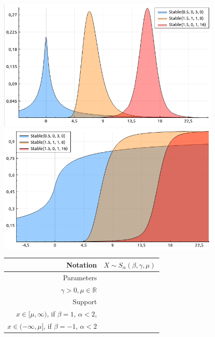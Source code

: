 \documentclass[a4paper,11pt]{article}
\theoremstyle{plain}
\theoremstyle{definition}
\newcommand{\MR}{\mathbb{R}}
\begin{document}
	\begin{figure}[!htb]\centering
		\begin{minipage}{0.55\textwidth}
			\includegraphics[width=\linewidth, right]{stable_pdf}
			\captionsetup{labelformat=empty}
			\includegraphics[width=\linewidth, right]{stable_cdf}
			\captionsetup{labelformat=empty}
		\end{minipage}
		\begin{minipage}{0.4\textwidth}
		\begin{tabular}{| r | l |}
			\hline
			Notation & $X \sim S_\alpha(\beta, \gamma, \mu)$ \\
			\hline
			Parameters & \pbox{\linewidth}{$\alpha \in (0, 2], \beta \in [-1, 1],$\\ $\gamma > 0, \mu \in \MR $} \\
			\hline
			Support & \pbox{\linewidth}{$ x \in \MR$, if  $\beta \neq 1$, \\  $ x \in [\mu, \infty)  $, if  $\beta = 1$, $\alpha < 2$, \\ $ x \in (-\infty, \mu]  $, if  $\beta = -1$, $\alpha < 2$}  \\

\end{tabular}
\end{minipage}
\end{figure}
\end{document}
